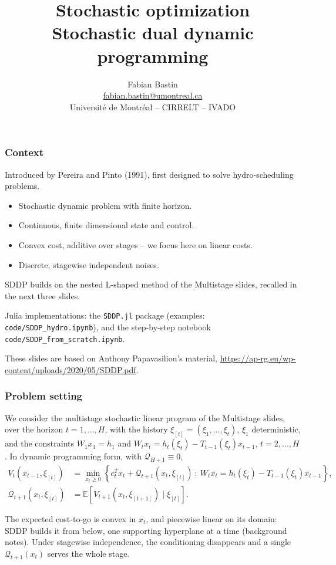 \documentclass[aspectratio=169]{beamer}
\title[SDDP]{Stochastic optimization\texorpdfstring{\\}{: }Stochastic dual dynamic programming}
\author[Fabian Bastin]{Fabian Bastin \texorpdfstring{\\ \url{fabian.bastin@umontreal.ca} \\}{, }
Université de Montréal -- CIRRELT -- IVADO}
\date{}
\def\EE{\mathbb{E}}
\def\QQ{\mathcal{Q}}
\begin{document}
\frame{\titlepage}

\begin{frame}
\frametitle{Context}

Introduced by Pereira and Pinto (1991), first designed to solve hydro-scheduling problems.

\smallskip

\begin{itemize}
\item
Stochastic dynamic problem with finite horizon.
\item
Continuous, finite dimensional state and control.
\item
Convex cost, additive over stages -- we focus here on linear costs.
\item
Discrete, stagewise independent noises.
\end{itemize}

\smallskip

SDDP builds on the nested L-shaped method of the Multistage slides, recalled in the next three slides.

\mbox{}

Julia implementations: the \texttt{SDDP.jl} package (examples: \texttt{code/SDDP\_hydro.ipynb}),
and the step-by-step notebook \texttt{code/SDDP\_from\_scratch.ipynb}.

\mbox{}

{\small These slides are based on Anthony Papavasiliou's material,
\url{https://ap-rg.eu/wp-content/uploads/2020/05/SDDP.pdf}.}

\end{frame}

\begin{frame}
\frametitle{Problem setting}

We consider the multistage stochastic linear program of the Multistage slides, over the horizon
$t = 1,\ldots, H$, with the history
$\xi_{[t]} = (\xi_1, \ldots, \xi_t)$, $\xi_1$ deterministic, and the constraints $W_1 x_1 = h_1$ and $W_t x_t = h_t(\xi_t) - T_{t-1}(\xi_t) x_{t-1}$, $t = 2,\ldots,H$.
In dynamic programming form, with $\QQ_{H+1} \equiv 0$,
\begin{align*}
V_t(x_{t-1}, \xi_{[t]}) &= \min_{x_t \geq 0} \left\{ c_t^Tx_t + \QQ_{t+1}(x_t, \xi_{[t]}) \ :\
W_t x_t = h_t(\xi_t) - T_{t-1}(\xi_t)x_{t-1} \right\}, \\
\QQ_{t+1}(x_t, \xi_{[t]}) &= \EE\left[ V_{t+1}(x_t, \xi_{[t+1]}) \mid \xi_{[t]} \right].
\end{align*}

{\small The expected cost-to-go is convex in $x_t$, and piecewise linear on its domain: SDDP builds it
from below, one supporting hyperplane at a time (background notes). Under stagewise independence, the
conditioning disappears and a single $\QQ_{t+1}(x_t)$ serves the whole stage.}

\end{frame}
\end{document}
